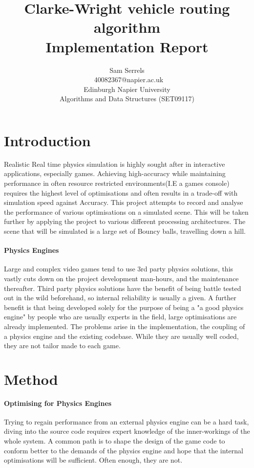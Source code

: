 \documentclass[conference]{acmsiggraph}
\title{Clarke-Wright vehicle routing algorithm\\
	   Implementation Report}
\author{Sam Serrels\\\ 40082367@napier.ac.uk \\
Edinburgh Napier University\\
Algorithms and Data Structures (SET09117)}
\begin{document}
\maketitle

\section{Introduction}

Realistic Real time physics simulation is highly sought after in interactive applications, especially games. Achieving high-accuracy while maintaining performance in often resource restricted environments(I.E a games console) requires the highest level of optimisations and often results in a trade-off with simulation speed against Accuracy. This project attempts to record and analyse the performance of various optimisations on a simulated scene. This will be taken further by applying the project to various different processing architectures. The scene that will be simulated is a large set of Bouncy balls, travelling down a hill.
\cite{CW}
\cite{CWj}
\paragraph{Physics Engines}
Large and complex video games tend to use 3rd party physics solutions, this vastly cuts down on the project development man-hours, and the maintenance thereafter. Third party physics solutions have the benefit of being battle tested out in the wild beforehand, so internal reliability is usually a given. A further benefit is that being developed solely for the purpose of being a "a good physics engine" by people who are usually experts in the field, large optimisations are already implemented. The problems arise in the implementation, the coupling of a physics engine and the existing codebase. While they are usually well coded, they are not tailor made to each game. 

\section{Method}
\paragraph{Optimising for Physics Engines}
Trying to regain performance from an external physics engine can be a hard task, diving into the source code requires expert knowledge of the inner-workings of the whole system. A common path is to shape the design of the game code to conform better to the demands of the physics engine and hope that the internal optimisations  will be sufficient. Often enough, they are not.
\end{document}

